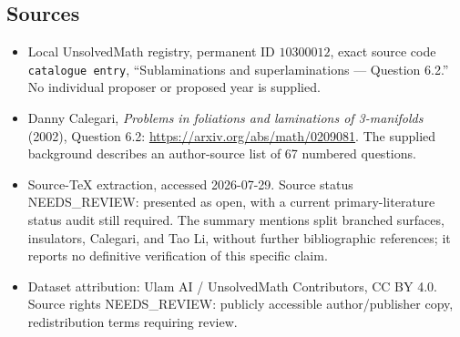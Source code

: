 \documentclass[11pt]{article}
\begin{document}
\subsection{Sources}
\begin{itemize}
\item Local UnsolvedMath registry, permanent ID \(10300012\), exact source code \texttt{catalogue entry}, ``Sublaminations and superlaminations --- Question 6.2.'' No individual proposer or proposed year is supplied.
\item Danny Calegari, \emph{Problems in foliations and laminations of 3-manifolds} (2002), Question 6.2: \url{https://arxiv.org/abs/math/0209081}. The supplied background describes an author-source list of 67 numbered questions.
\item Source-TeX extraction, accessed 2026-07-29. Source status NEEDS\_REVIEW: presented as open, with a current primary-literature status audit still required. The summary mentions split branched surfaces, insulators, Calegari, and Tao Li, without further bibliographic references; it reports no definitive verification of this specific claim.
\item Dataset attribution: Ulam AI / UnsolvedMath Contributors, CC BY 4.0. Source rights NEEDS\_REVIEW: publicly accessible author/publisher copy, redistribution terms requiring review.
\end{itemize}
\end{document}
